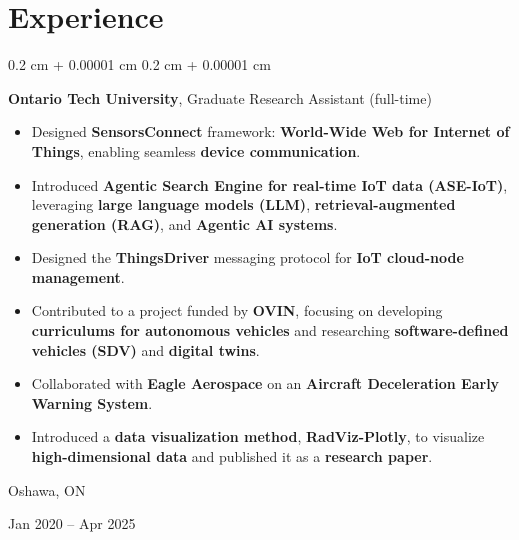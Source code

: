 \documentclass[10pt, letterpaper]{article}
\newenvironment{highlights}{
    \begin{itemize}[
        topsep=0.10 cm,
        parsep=0.10 cm,
        partopsep=0pt,
        itemsep=0pt,
        leftmargin=0.4 cm + 10pt
    ]
}{
    \end{itemize}
} %
\newenvironment{onecolentry}{
    \begin{adjustwidth}{
        0.2 cm + 0.00001 cm
    }{
        0.2 cm + 0.00001 cm
    }
}{
    \end{adjustwidth}
} %
\newenvironment{twocolentry}[2][]{
    \onecolentry
    \def\secondColumn{#2}
    \setcolumnwidth{\fill, 4.5 cm}
    \begin{paracol}{2}
}{
    \switchcolumn \raggedleft \secondColumn
    \end{paracol}
    \endonecolentry
} %
\let\hrefWithoutArrow\href
\renewcommand{\href}[2]{\hrefWithoutArrow{#1}{\ifthenelse{\equal{#2}{}}{ }{#2 }\raisebox{.15ex}{\footnotesize \faExternalLink*}}}
\begin{document}


\section{Experience}



        
        \begin{twocolentry}{
            Oshawa, ON

        Jan 2020 – Apr 2025
        }
            \textbf{Ontario Tech University}, Graduate Research Assistant (full-time)
            \begin{highlights}
            \item Designed \textbf{SensorsConnect} framework: \textbf{World-Wide Web for Internet of Things}, enabling seamless \textbf{device communication}.
            \item Introduced \textbf{Agentic Search Engine for real-time IoT data (ASE-IoT)}, leveraging \textbf{large language models (LLM)}, \textbf{retrieval-augmented generation (RAG)}, and \textbf{Agentic AI systems}.
            \item Designed the \textbf{ThingsDriver} messaging protocol for \textbf{IoT cloud-node management}.
            \item Contributed to a project funded by \textbf{OVIN}, focusing on developing \textbf{curriculums for autonomous vehicles} and researching \textbf{software-defined vehicles (SDV)} and \textbf{digital twins}.
            \item Collaborated with \textbf{Eagle Aerospace} on an \textbf{Aircraft Deceleration Early Warning System}.
            \item Introduced a \textbf{data visualization method}, \textbf{RadViz-Plotly}, to visualize \textbf{high-dimensional data} and published it as a \textbf{research paper}.
        \end{highlights}

        \end{twocolentry}


        \vspace{0.2 cm}
\end{document}
